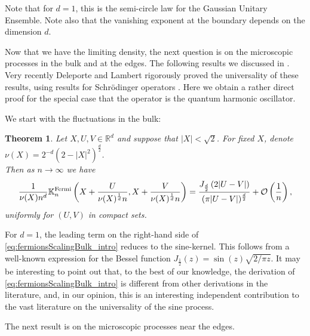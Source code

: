 \documentclass[%
 jmp,
cp,  %
 amsmath,amsthm,amssymb,%
 reprint,%
onecolumn]{revtex4-2}
\newtheorem{theorem}{Theorem}[section]
\begin{document}
Note that for $d=1$, this is the semi-circle law for the Gaussian Unitary Ensemble. Note also that the vanishing exponent at the boundary depends on the dimension $d$.

Now that we have the limiting density, the next question is on the microscopic processes in the bulk and at the edges. The following results we discussed in \cite{DeDoMaSc}. Very recently Deleporte and Lambert rigorously proved the universality of these results, using results for Schr\"odinger operators \cite{DeLa}. Here we obtain a rather direct proof for the special case that the operator is the quantum harmonic oscillator. 

We start with the fluctuations in the bulk:
\begin{theorem} \label{thm:fermionsScalingBulk_intro}
    Let $X, U, V\in\mathbb R^d$ and suppose that $\lvert X\rvert < \sqrt 2$. For fixed $X$, denote $\nu(X) = 2^{-d} (2-\lvert X\rvert^2)^\frac{d}{2}$.\\
    Then as $n\to\infty$ we have
    \begin{align} \label{eq:fermionsScalingBulk_intro}
    \frac{1}{\nu(X) n^d}{\mathbb K}_n^{\rm Fermi}\left(X+\frac{U}{\nu(X)^\frac{1}{d} n}, X + \frac{V}{\nu(X)^\frac{1}{d} n}\right) 
    =  \frac{J_\frac{d}{2}\left(2\lvert U-V\rvert\right)}{(\pi\lvert U-V\rvert)^\frac{d}{2}}
    +\mathcal O\left(\frac{1}{n}\right),
    \end{align}
    uniformly for $(U,V)$ in compact sets. 
    \end{theorem} 
    For $d=1$, the leading term on the right-hand side of \eqref{eq:fermionsScalingBulk_intro} reduces to the sine-kernel. This follows from a well-known expression for the Bessel function $J_{\frac 12}(z)=\sin(z)\sqrt{2/\pi z}$. It may be interesting to point out that, to the best of our knowledge, the derivation of \eqref{eq:fermionsScalingBulk_intro} is different from other derivations in the literature, and, in our opinion, this is an interesting independent contribution to the vast literature on the universality of the sine process. 

The next result is on the microscopic processes near the edges. 
    
\end{document}
